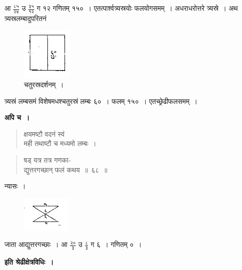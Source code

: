 \documentclass[11pt, openany]{book}
\begin{document}
\noindent आ $\frac{\mbox{८५}}{\mbox{२४}}$ उ $\frac{\mbox{३५}}{\mbox{१२}}$ ग १२ गणितम् १५०~। एतत्पार्श्वत्र्यस्रयोः फलयोगसमम्~। अधराधरोत्तरे त्र्यस्रे~। अथ त्र्यस्रलम्बादुपरितनं 

\begin{figure}[h!]
    \centering
    \captionsetup{labelformat=empty}
\caption{चतुरस्रदर्शनम्~।}
\vspace{-2mm}
    \includegraphics[scale=0.85]{graphics/capture97.png}
\end{figure}
\vspace{-2mm}

\noindent त्र्यस्रं लम्बसमं विशेषमधश्चतुरस्रं लम्बः ६०~। फलम् १५०~। 
एतच्छ्रेढीफलसमम्~। \\
\vspace{-2mm}

\textbf{अपि च~।} 
\begin{quote}
    \bqt 
क्षयमष्टौ वदनं स्वं \\
मही तथाष्टौ च मध्यमो लम्बः~।
\end{quote}

\newpage
\begin{quote}
    \bqt 
षड् यत्र तत्र गणका-\\
द्युत्तरगच्छान् फलं कथय~॥~६८~॥
\end{quote}

न्यासः~। 
\vspace{-2mm}

\begin{figure}[h!]
    \centering
    \includegraphics[scale=0.9]{graphics/capture98.png}
\end{figure}
\vspace{-2mm}

जाता आद्युत्तरगच्छाः~। आ $\frac{\mbox{२०}}{\mbox{३}}$ उ $\frac{\mbox{८}}{\mbox{३}}$ ग ६~। गणितम् ०~। 
\vspace{2mm}

\begin{center}
\textbf{इति श्रेढीक्षेत्रविधिः~।}
\end{center}
\vspace{2mm}
\end{document}
